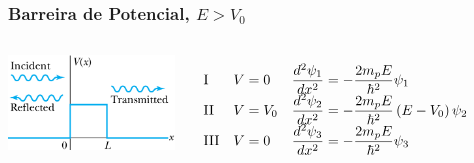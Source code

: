 \documentclass[12pt,brazil,table]{beamer}
\begin{document}
\begin{frame}
  \frametitle{Barreira de Potencial, $E>V_0$}
  
  \fontsize{8pt}{11pt}\selectfont
  
  \vspace*{-1.cm}
    \begin{minipage}[t][20ex][t]{\linewidth}
  
      \begin{columns}
          \begin{center}
            \includegraphics[height=2.5cm]{figuras/fig34}
          \end{center}
        
        \[
        \begin{array}[1.2]{lll}
          \text{I} & V=0 & \dfrac{d^2\psi_1}{dx^2}=-\dfrac{2m_pE}{\hbar^2}\psi_1\\
          \text{II} & V=V_0 & \dfrac{d^2\psi_2}{dx^2}=-\dfrac{2m_pE}{\hbar^2}\left(E-V_0\right)\psi_2\\
          \text{III} & V=0 & \dfrac{d^2\psi_3}{dx^2}=-\dfrac{2m_pE}{\hbar^2}\psi_3
        \end{array}
          \]
        
        \end{columns}
    \end{minipage}
   
%   
    \begin{minipage}[b][20ex][t]{\linewidth}
  \vspace*{-0.5cm}
      \begin{columns}


\end{columns}
\end{minipage}
\end{frame}
\end{document}
